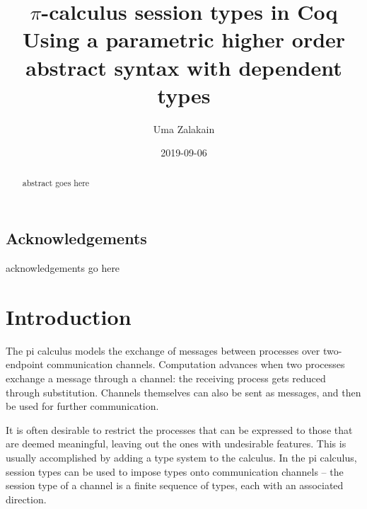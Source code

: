 \documentclass{mproj}
\begin{document}
\title{$\pi$-calculus session types in Coq \\
\large Using a parametric higher order abstract syntax with dependent types}
\author{Uma Zalakain}
\date{2019-09-06}
\maketitle

\begin{abstract}
abstract goes here
\end{abstract}

\educationalconsent
\vfill{}
\doclicenseThis
\newpage

\section*{Acknowledgements}

acknowledgements go here

\tableofcontents

\chapter{Introduction}\label{intro}

The pi calculus models the exchange of messages between processes over
two-endpoint communication channels. Computation advances when two processes
exchange a message through a channel: the receiving process gets reduced through
substitution. Channels themselves can also be sent as messages, and then be used
for further communication.

It is often desirable to restrict the processes that can be expressed to those
that are deemed meaningful, leaving out the ones with undesirable features.
This is usually accomplished by adding a type system to the calculus. In the pi
calculus, session types can be used to impose types onto communication channels
-- the session type of a channel is a finite sequence of types, each with an
associated direction.
\end{document}
